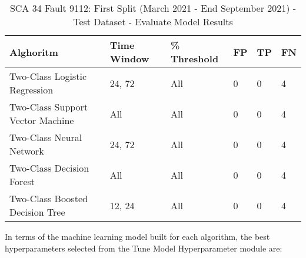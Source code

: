 \begin{table}[!ht]
    \centering
    \begin{tabular}{|l|l|l|l|l|l|}
    \hline
        Alghoritm & Time Window & \% Threshold & FP & TP & FN \\ \hline
        Two-Class Logistic Regression & 24, 72 & All & 0 & 0 & 4 \\ \hline
        Two-Class Support Vector Machine & All & All & 0 & 0 & 4 \\ \hline
        Two-Class Neural Network & 24, 72 & All & 0 & 0 & 4 \\ \hline
        Two-Class Decision Forest & All & All & 0 & 0 & 4 \\ \hline
        Two-Class Boosted Decision Tree & 12, 24 & All & 0 & 0 & 4 \\ \hline
    \end{tabular}
    \caption{SCA 34 Fault 9112: First Split (March 2021 - End September 2021) - Test Dataset - Evaluate Model Results}
    \label{9112_SCA34_1st}
\end{table}

In terms of the machine learning model built for each algorithm, the best hyperparameters selected from the Tune Model Hyperparameter module are:

